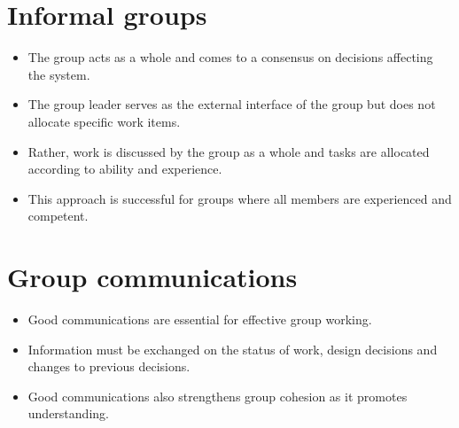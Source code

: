 \section{ Informal groups}
\begin{itemize}

\item The group acts as a whole and comes to a consensus on decisions affecting the system.

\item The group leader serves as the external interface of the group but does not allocate specific work items.

\item Rather, work is discussed by the group as a whole and tasks are allocated according to ability and experience.

\item This approach is successful for groups where all members are experienced and competent.

\end{itemize}
\section{ Group communications}
\begin{itemize}

\item Good communications are essential for effective group working.

\item Information must be exchanged on the status of work, design decisions and changes to previous decisions.

\item Good communications also strengthens group cohesion as it promotes understanding.


\end{itemize}
